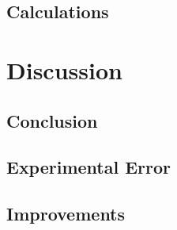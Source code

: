 \documentclass{article}
\begin{document}
\subsection*{Calculations}%

\section*{Discussion}%
\subsection*{Conclusion}

\subsection*{Experimental Error} %

\subsection*{Improvements} %
\end{document}
